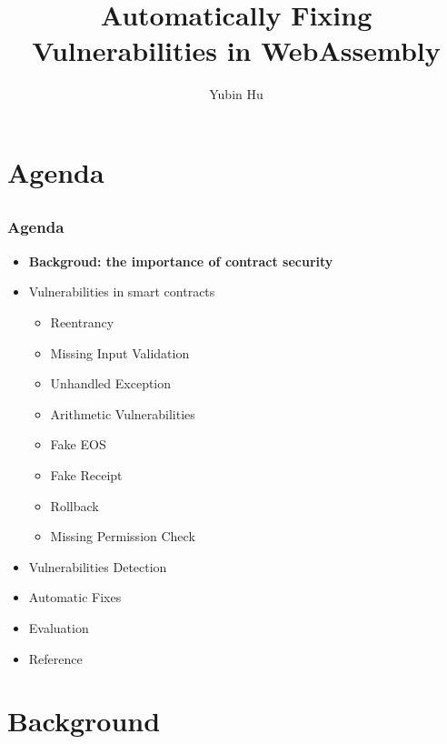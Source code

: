 \documentclass[notheorems, aspectratio=54]{beamer}
\title[Automatically Fixing Vulnerabilities in WebAssembly]{Automatically Fixing Vulnerabilities in WebAssembly}
\author{Yubin Hu}
\institute[BUPT]{yubin.hu@bupt.edu.cn}
\begin{document}
\begin{frame}
    \titlepage
\end{frame}


\section{Agenda}
\subsection{}
\begin{frame}
    \frametitle{Agenda}

    \begin{itemize}
        \item \textbf{Backgroud: the importance of contract security}
        \item Vulnerabilities in smart contracts
        \begin{itemize}
            \item Reentrancy
            \item Missing Input Validation
            \item Unhandled Exception
            \item Arithmetic Vulnerabilities
            \item Fake EOS
            \item Fake Receipt
            \item Rollback
            \item Missing Permission Check
        \end{itemize}
        \item Vulnerabilities Detection
        \item Automatic Fixes
        \item Evaluation
        \item Reference
    \end{itemize}
    
\end{frame}


\section{Background}
\end{document}
